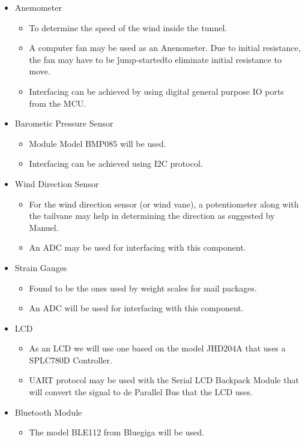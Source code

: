 			\begin{itemize}
				\item Anemometer
				\begin{itemize}
					\item To determine the speed of the wind inside the tunnel.
					\item A computer fan may be used as an Anenometer. Due to initial resistance, the fan may have to be \'jump-started\' to eliminate initial resistance to move.
					\item Interfacing can be achieved by using digital general purpose IO ports from the MCU.
				\end{itemize}
				\item Barometic Pressure Sensor
				\begin{itemize}
					\item Module Model BMP085 will be used.
					\item Interfacing can be achieved using I2C protocol.
				\end{itemize}
				\item Wind Direction Sensor
				\begin{itemize}
					\item For the wind direction sensor (or wind vane), a potentiometer along with the tailvane may help in determining the direction as suggested by Manuel.
					\item An ADC may be used for interfacing with this component.
				\end{itemize}
				\item Strain Gauges
				\begin{itemize}
					\item Found to be the ones used by weight scales for mail packages.
					\item An ADC will be used for interfacing with this component.
				\end{itemize}
				\item LCD
				\begin{itemize}
					\item As an LCD we will use one based on the model JHD204A that uses a SPLC780D Controller.
					\item UART protocol may be used with the Serial LCD Backpack Module that will convert the signal to de Parallel Bus that the LCD uses.
				\end{itemize}
				\item Bluetooth Module
				\begin{itemize}
					\item The model BLE112 from Bluegiga will be used.

\end{itemize}
\end{itemize}
